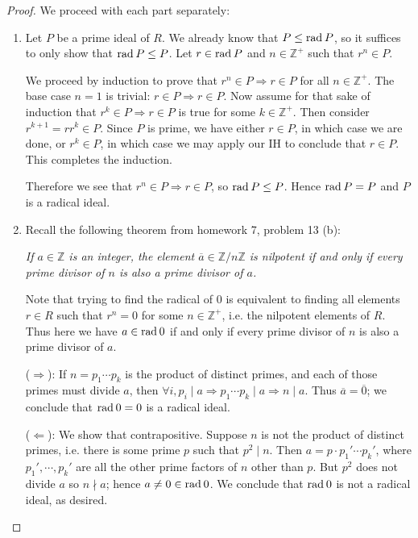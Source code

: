 \documentclass[12pt]{article}
\theoremstyle{remark}
\theoremstyle{named}
\newcommand{\Z}{\mathbb Z}
\newcommand{\rad}{\text{rad}\hspace*{0.7mm}}
\begin{document}
\begin{proof}
    We proceed with each part separately:
    \begin{enumerate}
        \item Let \(P\) be a prime ideal of \(R\). We already know that \(P \le \rad P\), so it suffices to only show that \(\rad P \le P\). Let \(r \in \rad P\) and \(n \in \Z^+\) such that \(r^n \in P\). 
        
        We proceed by induction to prove that \(r^n \in P \Rightarrow r \in P\) for all \(n \in \Z^+\). The base case \(n = 1\) is trivial: \(r \in P \Rightarrow r \in P\). Now assume for that sake of induction that \(r^k \in P \Rightarrow r \in P\) is true for some \(k \in \Z^+\). Then consider \(r^{k + 1} = rr^k\in P\). Since \(P\) is prime, we have either \(r \in P\), in which case we are done, or \(r^k \in P\), in which case we may apply our IH to conclude that \(r \in P\). This completes the induction. 

        Therefore we see that \(r^n \in P \Rightarrow r \in P\), so \(\rad P \le P\). Hence \(\rad P = P\) and \(P\) is a radical ideal.
        
        \item Recall the following theorem from homework 7, problem 13 (b):
        
        \textit{If \(a \in \Z\) is an integer, the element \(\overline{a} \in \Z / n \Z\) is nilpotent if and only if every prime divisor of \(n\) is also a prime divisor of \(a\).}

        Note that trying to find the radical of \(0\) is equivalent to finding all elements \(r \in R\) such that \(r^n = 0\) for some \(n \in \Z^+\), i.e. the nilpotent elements of \(R\). Thus here we have \(a \in \rad 0\) if and only if every prime divisor of \(n\) is also a prime divisor of \(a\).

        (\(\Rightarrow\)): If \(n = p_1 \cdots p_k\) is the product of distinct primes, and each of those primes must divide \(a\), then \(\forall i, p_i \mid a \Rightarrow p_1 \cdots p_k \mid a \Rightarrow n \mid a\). Thus \(\overline{a} = \overline{0}\); we conclude that \(\rad 0 = 0\) is a radical ideal. 

        (\(\Leftarrow\)): We show that contrapositive. Suppose \(n\) is not the product of distinct primes, i.e. there is some prime \(p\) such that \(p^2 \mid n\). Then \(a = p\cdot p_1' \cdots p_k'\), where \(p_1', \cdots, p_k'\) are all the other prime factors of \(n\) other than \(p\). But \(p^2\) does not divide \(a\) so \(n \nmid a\); hence \(a \neq 0 \in \rad 0\). We conclude that \(\rad 0\) is not a radical ideal, as desired.
    \end{enumerate}
\end{proof}
\end{document}
